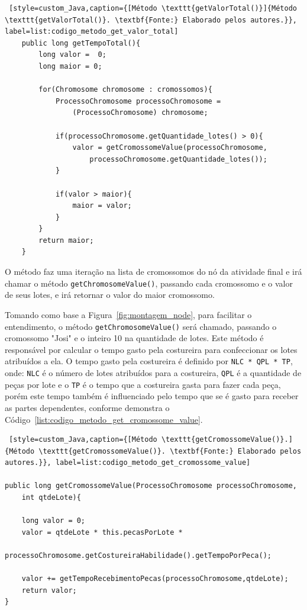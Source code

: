\begin{lstlisting} [style=custom_Java,caption={[Método \texttt{getValorTotal()}]{Método \texttt{getValorTotal()}. \textbf{Fonte:} Elaborado pelos autores.}}, label=list:codigo_metodo_get_valor_total] 	
	public long getTempoTotal(){
		long valor =  0;
		long maior = 0;
		
		for(Chromosome chromosome : cromossomos){
			ProcessoChromosome processoChromosome = 
				(ProcessoChromosome) chromosome;
		
			if(processoChromosome.getQuantidade_lotes() > 0){
				valor = getCromossomeValue(processoChromosome,
					processoChromosome.getQuantidade_lotes());
			}
	
			if(valor > maior){
				maior = valor;
			}
		}
		return maior;
	}

\end{lstlisting}


\par O método faz uma iteração na lista de cromossomos do nó da atividade final e irá chamar o método \texttt{getChromosomeValue()}, passando 
cada cromossomo e o valor de seus lotes, e irá retornar o valor do maior cromossomo.

\par Tomando como base a Figura~\ref{fig:montagem_node}, para facilitar o
entendimento, o método \texttt{get\-ChromosomeValue()} será chamado, passando o
cromossomo "Josi" e o inteiro 10 na quantidade de lotes.
Este método é responsável por calcular o tempo gasto 
pela costureira para confeccionar os lotes atribuídos a ela. O tempo gasto pela
costureira é definido por \texttt{NLC * QPL * TP}, onde: \texttt{NLC} é o número
de lotes atribuídos para a costureira, \texttt{QPL} é a quantidade de peças por
lote e o \texttt{TP} é o tempo que a costureira gasta para fazer cada peça, 
porém este tempo também é influenciado pelo tempo que se é gasto para receber 
as partes dependentes, conforme demonstra o Código~\ref{list:codigo_metodo_get_cromossome_value}.


\begin{lstlisting} [style=custom_Java,caption={[Método \texttt{getCromossomeValue()}.]{Método \texttt{getCromossomeValue()}. \textbf{Fonte:} Elaborado pelos autores.}}, label=list:codigo_metodo_get_cromossome_value] 	

public long getCromossomeValue(ProcessoChromosome processoChromosome,
	int qtdeLote){
	
	long valor = 0;
	valor = qtdeLote * this.pecasPorLote *
		 processoChromosome.getCostureiraHabilidade().getTempoPorPeca();

	valor += getTempoRecebimentoPecas(processoChromosome,qtdeLote);
	return valor;
}

\end{lstlisting}

